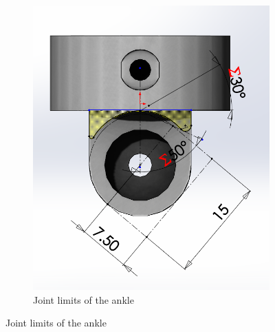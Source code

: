 \begin{figure}[ht!]
\begin{subfigure}[b]{0.49\textwidth}
        \includegraphics[width=\textwidth]{figures/joint_limits_ankle_upper.PNG}
        \caption{Joint limits of the ankle}
        \label{fig:joint_limits_ankle_upper}
    \end{subfigure}
\end{figure}    

